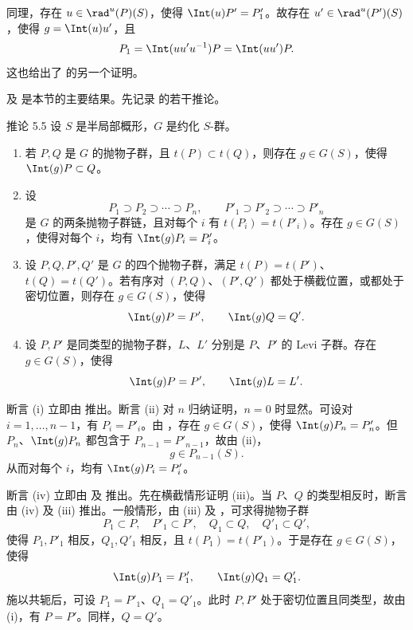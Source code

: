 同理，存在 \(u\in\rad^u(P)(S)\)，使得 \(\Int(u)P'=P'_1\)。故存在 \(u'\in\rad^u(P')(S)\)，使得 \(g=\Int(u)u'\)，且
\[
 P_1=\Int(uu'u^{-1})P=\Int(uu')P.
\]
这也给出了  的另一个证明。

 及  是本节的主要结果。先记录  的若干推论。

\begin{sgastatement}{推论 5.5}
设 \(S\) 是半局部概形，\(G\) 是约化 \(S\)-群。
\begin{enumerate}[label=\textup{(\roman*)}]
\item 若 \(P,Q\) 是 \(G\) 的抛物子群，且 \(t(P)\subset t(Q)\)，则存在 \(g\in G(S)\)，使得 \(\Int(g)P\subset Q\)。
\item 设
\[
 P_1\supset P_2\supset\cdots\supset P_n,\qquad
 P'_1\supset P'_2\supset\cdots\supset P'_n
\]
是 \(G\) 的两条抛物子群链，且对每个 \(i\) 有 \(t(P_i)=t(P'_i)\)。存在 \(g\in G(S)\)，使得对每个 \(i\)，均有 \(\Int(g)P_i=P'_i\)。
\item 设 \(P,Q,P',Q'\) 是 \(G\) 的四个抛物子群，满足 \(t(P)=t(P')\)、\(t(Q)=t(Q')\)。若有序对 \((P,Q)\)、\((P',Q')\) 都处于横截位置，或都处于密切位置，则存在 \(g\in G(S)\)，使得
\[
 \Int(g)P=P',\qquad\Int(g)Q=Q'.
\]
\item 设 \(P,P'\) 是同类型的抛物子群，\(L\)、\(L'\) 分别是 \(P\)、\(P'\) 的 Levi 子群。存在 \(g\in G(S)\)，使得
\[
 \Int(g)P=P',\qquad\Int(g)L=L'.
\]
\end{enumerate}
\end{sgastatement}

\SGAProof
断言 \textup{(i)} 立即由  推出。断言 \textup{(ii)} 对 \(n\) 归纳证明，\(n=0\) 时显然。可设对 \(i=1,\ldots,n-1\)，有 \(P_i=P'_i\)。由 ，存在 \(g\in G(S)\)，使得 \(\Int(g)P_n=P'_n\)。但 \(P_n\)、\(\Int(g)P_n\) 都包含于 \(P_{n-1}=P'_{n-1}\)，故由 \textup{(ii)}，
\[
 g\in P_{n-1}(S).
\]
从而对每个 \(i\)，均有 \(\Int(g)P_i=P'_i\)。

断言 \textup{(iv)} 立即由  及  推出。先在横截情形证明 \textup{(iii)}。当 \(P\)、\(Q\) 的类型相反时，断言由 \textup{(iv)} 及 \textup{(iii)} 推出。一般情形，由 \textup{(iii)} 及 ，可求得抛物子群
\[
 P_1\subset P,\quad P'_1\subset P',\quad
 Q_1\subset Q,\quad Q'_1\subset Q',
\]
使得 \(P_1,P'_1\) 相反，\(Q_1,Q'_1\) 相反，且 \(t(P_1)=t(P'_1)\)。于是存在 \(g\in G(S)\)，使得
\[
 \Int(g)P_1=P'_1,\qquad\Int(g)Q_1=Q'_1.
\]
施以共轭后，可设 \(P_1=P'_1\)、\(Q_1=Q'_1\)。此时 \(P,P'\) 处于密切位置且同类型，故由 \textup{(i)}，有 \(P=P'\)。同样，\(Q=Q'\)。

